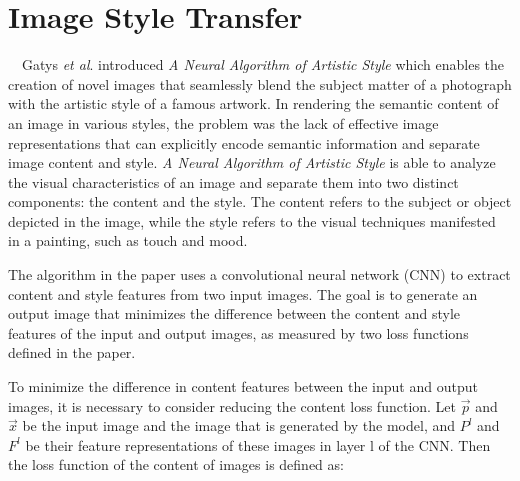 \section{Image Style Transfer}
　Gatys \textit{et al}. \cite{Gatys_2016_CVPR} introduced \textit{A Neural Algorithm 
of Artistic Style} which enables the creation of novel images that seamlessly blend 
the subject matter of a photograph with the artistic style of a famous artwork.
In rendering the semantic content of an image in various styles, the problem was
the lack of effective image representations that can explicitly encode semantic 
information and separate image content and style. 
\textit{A Neural Algorithm of Artistic Style} \cite{Gatys_2016_CVPR} is able to 
analyze the visual characteristics of an image and separate them into two distinct 
components: the content and the style.
The content refers to the subject or object depicted in the image, while the style 
refers to the visual techniques manifested in a painting, such as touch and mood.

The algorithm in the paper uses a convolutional neural network (CNN) to extract
content and style features from two input images. The goal is to generate an 
output image that minimizes the difference between the content and style features 
of the input and output images, as measured by two loss functions defined in the 
paper. 

To minimize the difference in content features between the input and output images,
it is necessary to consider reducing the content loss function. 
Let $\vec{p}$ and $\vec{x}$ be the input image and the image that is generated by
the model, and  $P^l$ and $F^l$ be their feature representations of these images in 
layer l of the CNN. Then the loss function of the content of images is defined as:

